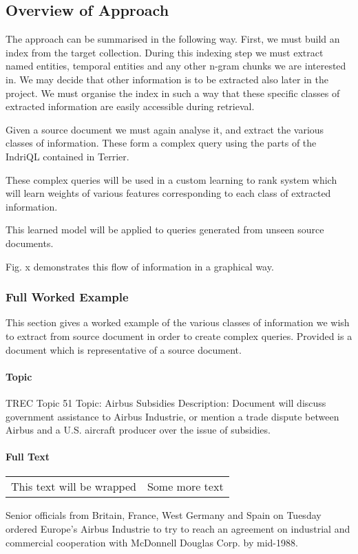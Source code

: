 \documentclass{mprop}
\begin{document}
\subsection{Overview of Approach}
The approach can be summarised in the following way.
First, we must build an index from the target collection. During this indexing step we must extract named entities, temporal entities and any other n-gram chunks we are interested in. 
We may decide that other information is to be extracted also later in the project.
We must organise the index in such a way that these specific classes of extracted information are easily accessible during retrieval.

Given a source document we must again analyse it, and extract the various classes of information.
These form a complex query using the parts of the IndriQL contained in Terrier.

These complex queries will be used in a custom learning to rank system which will learn weights of various features corresponding to each class of extracted information.

This learned model will be applied to queries generated from unseen source documents.

Fig. x demonstrates this flow of information in a graphical way.


\subsubsection{Full Worked Example}
This section gives a worked example of the various classes of information we wish to extract from source document in order to create complex queries.
Provided is a document which is representative of a source document.
\paragraph{Topic}
TREC Topic 51
Topic: Airbus Subsidies
Description: Document will discuss government assistance to Airbus Industrie, or mention a
trade dispute between Airbus and a U.S. aircraft producer over the issue of
subsidies. 

\paragraph{Full Text}

\begin{tabular}{|p{10cm}|p{3cm}|}
  This text will be wrapped & Some more text \\
\end{tabular}
Senior officials from Britain, France, West Germany and Spain on Tuesday ordered Europe's Airbus Industrie to try to reach an agreement on industrial and commercial cooperation with McDonnell Douglas Corp. by mid-1988.
\end{document}
